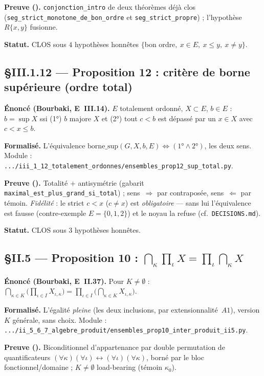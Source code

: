 \textbf{Preuve (\Nstar).} \texttt{conjonction\_intro} de deux théorèmes déjà clos
(\texttt{seg\_strict\_monotone\_de\_bon\_ordre} et \texttt{seg\_strict\_propre}) ;
l'hypothèse $R\{x,y\}$ fusionne.

\textbf{Statut.} CLOS sous $4$ hypothèses honnêtes $\{$bon ordre$,\ x\in E,\ x\leq y,\ x\neq y\}$.

\subsection{§III.1.12 --- Proposition 12 : critère de borne supérieure (ordre total)}
\textbf{Énoncé (Bourbaki, E~III.14).} $E$ totalement ordonné, $X\subset E$, $b\in E$ :
$b=\sup X$ ssi (1°) $b$ majore $X$ et (2°) tout $c<b$ est dépassé par un $x\in X$ avec $c<x\leq b$.

\textbf{Formalisé.} L'équivalence $\mathrm{borne\_sup}(G,X,b,E)\Leftrightarrow(\text{1°}\wedge\text{2°})$,
les deux sens. Module :
\texttt{.../iii\_1\_12\_totalement\_ordonnes/ensembles\_prop12\_sup\_total.py}.

\textbf{Preuve (\Nstar).} Totalité $+$ antisymétrie (gabarit
\texttt{maximal\_est\_plus\_grand\_si\_total}) ; sens~$\Rightarrow$ par contraposée,
sens~$\Leftarrow$ par témoin. \emph{Fidélité} : le strict $c<x$ ($c\neq x$) est
\emph{obligatoire} --- sans lui l'équivalence est fausse (contre-exemple
$E=\{0,1,2\}$) et le noyau la refuse (cf.\ \texttt{DECISIONS.md}).

\textbf{Statut.} CLOS sous $3$ hypothèses honnêtes.

\subsection{§II.5 --- Proposition 10 : $\bigcap_\kappa\prod_\iota X = \prod_\iota\bigcap_\kappa X$}
\textbf{Énoncé (Bourbaki, E~II.37).} Pour $K\neq\emptyset$ :
$\bigcap_{\kappa\in K}\bigl(\prod_{\iota\in I}X_{\iota,\kappa}\bigr)
= \prod_{\iota\in I}\bigl(\bigcap_{\kappa\in K}X_{\iota,\kappa}\bigr)$.

\textbf{Formalisé.} L'égalité \emph{pleine} (les deux inclusions, par extensionnalité~$A1$),
version $K$ générale, sans choix. Module :
\texttt{.../ii\_5\_6\_7\_algebre\_produit/ensembles\_prop10\_inter\_produit\_ii5.py}.

\textbf{Preuve (\Nstar).} Biconditionnel d'appartenance par double permutation de
quantificateurs $(\forall\kappa)(\forall\iota)\leftrightarrow(\forall\iota)(\forall\kappa)$,
borné par le bloc fonctionnel/domaine ; $K\neq\emptyset$ load-bearing (témoin $\kappa_0$).

